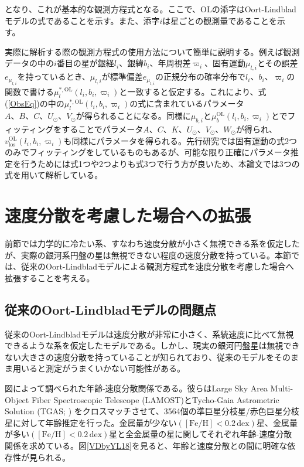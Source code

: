 となり、これが基本的な観測方程式となる。ここで、OLの添字はOort-Lindbladモデルの式であることを示す。また、添字$i$は星ごとの観測量であることを示す。

実際に解析する際の観測方程式の使用方法について簡単に説明する。例えば観測データの中の$i$番目の星が銀経$l_i$、銀緯$b_i$、年周視差$\varpi_i$、固有運動$\mu_ {l,i}$とその誤差$e_{\mu_ {l,i}}$を持っているとき、$\mu_{l,i}$が標準偏差$e_{\mu_ {l,i}}$の正規分布の確率分布で$l_i、b_i、\varpi_i$の関数で書ける$\mu^{*,\mathrm{OL}}_l(l_i,b_i,\varpi_i)$と一致すると仮定する。これにより、式(\ref{ObsEq})の中の$\mu^{*,\mathrm{OL}}_l(l_i,b_i,\varpi_i)$の式に含まれているパラメータ$A、B、C、U_{\odot}、V_{\odot}$が得られることになる。同様に$\mu_{b,i}$と$\mu^{\mathrm{OL}}_b(l_i,b_i,\varpi_i)$とでフィッティングをすることでパラメータ$A、C、K、U_{\odot}、V_{\odot}、W_{\odot}$が得られ、$v^{\mathrm{OL}}_{\mathrm{los}}(l_i,b_i,\varpi_i)$も同様にパラメータを得られる。先行研究では固有運動の式2つのみでフィッティングをしているものもあるが、可能な限り正確にパラメータ推定を行うためには式1つや2つよりも式3つで行う方が良いため、本論文では3つの式を用いて解析している。


\section{速度分散を考慮した場合への拡張} %
前節では力学的に冷たい系、すなわち速度分散が小さく無視できる系を仮定したが、実際の銀河系円盤の星は無視できない程度の速度分散を持っている。本節では、従来のOort-Lindbladモデルによる観測方程式を速度分散を考慮した場合へ拡張することを考える。

\subsection{従来のOort-Lindbladモデルの問題点} %
従来のOort-Lindbladモデルは速度分散が非常に小さく、系統速度に比べて無視できるような系を仮定したモデルである。しかし、現実の銀河円盤星は無視できない大きさの速度分散を持っていることが知られており、従来のモデルをそのまま用いると測定がうまくいかない可能性がある。

図\cite{YL18}によって調べられた年齢-速度分散関係である。彼らはLarge Sky Area Multi-Object Fiber Spectroscopic Telescope (LAMOST)とTycho-Gaia Astrometric Solution (TGAS; \cite{Gaia2016}) をクロスマッチさせて、3564個の準巨星分枝星/赤色巨星分枝星に対して年齢推定を行った。金属量が少ない$([\mathrm{Fe}/\mathrm{H}] < 0.2\,\mathrm{dex})$星、金属量が多い$([\mathrm{Fe}/\mathrm{H}] < 0.2\,\mathrm{dex})$星と全金属量の星に関してそれぞれ年齢-速度分散関係を求めている。図\ref{VDbyYL18}を見ると、年齢と速度分散との間に明確な依存性が見られる。

